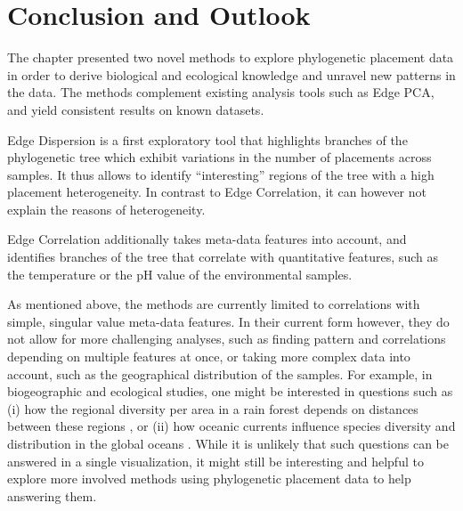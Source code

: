 
\section{Conclusion and Outlook}
\label{ch:Visualization:sec:ConclusionOutlook}


The chapter presented two novel methods to explore phylogenetic placement data
in order to derive biological and ecological knowledge and unravel new patterns in the data.
The methods complement existing analysis tools such as Edge PCA,
and yield consistent results on known datasets.

Edge Dispersion is a first exploratory tool that highlights branches of the phylogenetic tree
which exhibit variations in the number of placements across samples.
It thus allows to identify ``interesting'' regions of the tree with a high placement heterogeneity.
In contrast to Edge Correlation, it can however not explain the reasons of heterogeneity.

Edge Correlation additionally takes meta-data features into account,
and identifies branches of the tree that correlate with quantitative features,
such as the temperature or the pH value of the environmental samples.


As mentioned above, the methods are currently limited to correlations with simple, singular value meta-data features.
In their current form however, they do not allow for more challenging analyses,
such as finding pattern and correlations depending on multiple features at once,
or taking more complex data into account, such as the geographical distribution of the samples.
For example, in biogeographic and ecological studies, one might be interested in questions such as
(i) how the regional diversity per area in a rain forest depends on distances between these regions \cite{Lentendu2018},
or (ii) how oceanic currents influence species diversity and distribution in the global oceans \cite{Sunagawa2015}.
While it is unlikely that such questions can be answered in a single visualization,
it might still be interesting and helpful to explore more involved methods
using phylogenetic placement data to help answering them.
